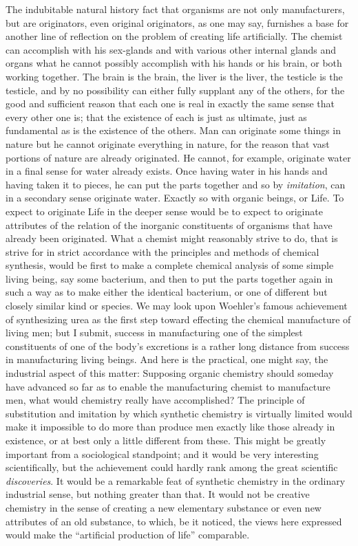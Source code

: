 \documentclass[a4paper, 11pt, oneside, polutonikogreek, english, landscape]{article}
\begin{document}
The indubitable natural history fact that organisms are not only manufacturers, but are originators, even original originators, as one may say, furnishes a base for another line of reflection on the problem of creating life artificially. The chemist can accomplish with his sex-glands and with various other internal glands and organs what he cannot possibly accomplish with his hands or his brain, or both working together. The brain is the brain, the liver is the liver, the testicle is the testicle, and by no possibility can either fully supplant any of the others, for the good and sufficient reason that each one is real in exactly the same sense that every other one is; that the existence of each is just as ultimate, just as fundamental as is the existence of the others. Man can originate some things in nature but he cannot originate everything in nature, for the reason that vast portions of nature are already originated. He cannot, for example, originate water in a final sense for water already exists. Once having water in his hands and having taken it to pieces, he can put the parts together and so by \emph{imitation}, can in a secondary sense originate water. Exactly so with organic beings, or Life. To expect to originate Life in the deeper sense would be to expect to originate attributes of the relation of the inorganic constituents of organisms that have already been originated. What a chemist might reasonably strive to do, that is strive for in strict accordance with the principles and methods of chemical synthesis, would be first to make a complete chemical analysis of some simple living being, say some bacterium, and then to put the parts together again in such a way as to make either the identical bacterium, or one of different but closely similar kind or species. We may look upon Woehler's famous achievement of synthesizing urea as the first step toward effecting the chemical manufacture of living men; but I submit, success in manufacturing one of the simplest constituents of one of the body's excretions is a rather long distance from success in manufacturing living beings. And here is the practical, one might say, the industrial aspect of this matter: Supposing organic chemistry should someday have advanced so far as to enable the manufacturing chemist to manufacture men, what would chemistry really have accomplished? The principle of substitution and imitation by which synthetic chemistry is virtually limited would make it impossible to do more than produce men exactly like those already in existence, or at best only a little different from these. This might be greatly important from a sociological standpoint; and it would be very interesting scientifically, but the achievement could hardly rank among the great scientific \emph{discoveries}. It would be a remarkable feat of synthetic chemistry in the ordinary industrial sense, but nothing greater than that. It would not be creative chemistry in the sense of creating a new elementary substance or even new attributes of an old substance, to which, be it noticed, the views here expressed would make the ``artificial production of life'' comparable.
\end{document}
